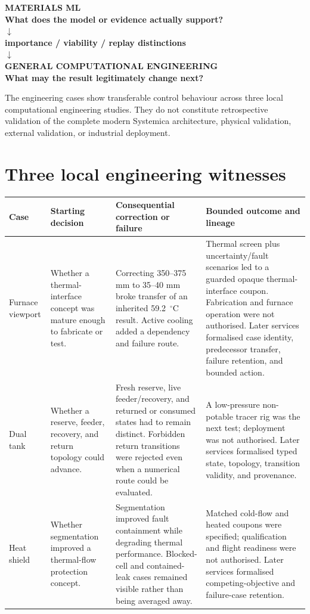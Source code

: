 \documentclass[11pt,a4paper,oneside]{report}
\begin{document}
\begin{center}\small\bfseries
MATERIALS ML\\
What does the model or evidence actually support?\\
$\downarrow$\\
importance / viability / replay distinctions\\
$\downarrow$\\
GENERAL COMPUTATIONAL ENGINEERING\\
What may the result legitimately change next?
\end{center}

The engineering cases show transferable control behaviour across three local computational engineering studies. They do not constitute retrospective validation of the complete modern Systemica architecture, physical validation, external validation, or industrial deployment.

\section{Three local engineering witnesses}

\begin{longtable}{L{0.13\textwidth}L{0.18\textwidth}L{0.29\textwidth}L{0.29\textwidth}}
\toprule
\textbf{Case} & \textbf{Starting decision} & \textbf{Consequential correction or failure} & \textbf{Bounded outcome and lineage}\\
\midrule
Furnace viewport & Whether a thermal-interface concept was mature enough to fabricate or test. & Correcting 350--375 mm to 35--40 mm broke transfer of an inherited 59.2~$^\circ$C result. Active cooling added a dependency and failure route. & Thermal screen plus uncertainty/fault scenarios led to a guarded opaque thermal-interface coupon. Fabrication and furnace operation were not authorised. Later services formalised case identity, predecessor transfer, failure retention, and bounded action.\\
Dual tank & Whether a reserve, feeder, recovery, and return topology could advance. & Fresh reserve, live feeder/recovery, and returned or consumed states had to remain distinct. Forbidden return transitions were rejected even when a numerical route could be evaluated. & A low-pressure non-potable tracer rig was the next test; deployment was not authorised. Later services formalised typed state, topology, transition validity, and provenance.\\
Heat shield & Whether segmentation improved a thermal-flow protection concept. & Segmentation improved fault containment while degrading thermal performance. Blocked-cell and contained-leak cases remained visible rather than being averaged away. & Matched cold-flow and heated coupons were specified; qualification and flight readiness were not authorised. Later services formalised competing-objective and failure-case retention.\\
\bottomrule
\end{longtable}
\end{document}
